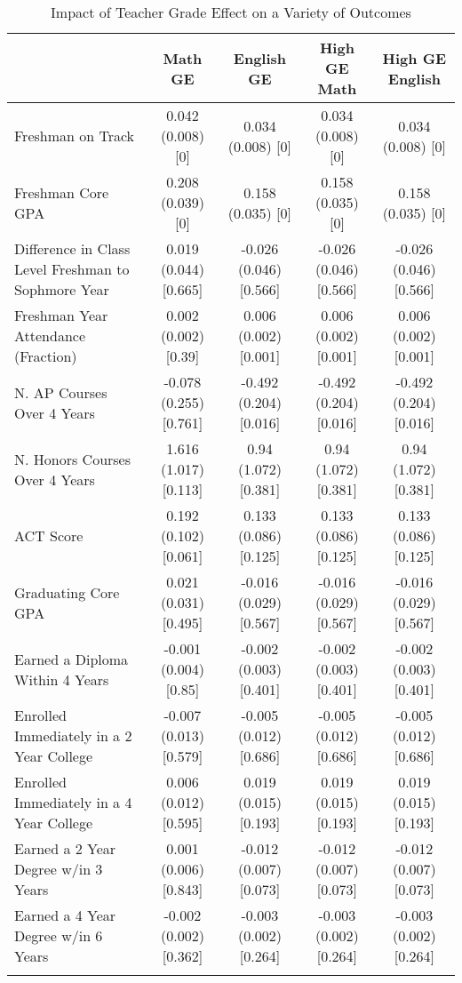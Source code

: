 \begin{table}

\caption{Impact of Teacher Grade Effect on a Variety of Outcomes\label{tbl:results}}
\centering
\begin{tabular}[t]{lcccc}
\toprule{}
  & Math GE & English GE & High GE Math & High GE English\\
\midrule{}
Freshman on Track & 0.042 (0.008) [0] & 0.034 (0.008) [0] & 0.034 (0.008) [0] & 0.034 (0.008) [0]\\
Freshman Core GPA & 0.208 (0.039) [0] & 0.158 (0.035) [0] & 0.158 (0.035) [0] & 0.158 (0.035) [0]\\
Difference in Class Level Freshman to Sophmore Year & 0.019 (0.044) [0.665] & -0.026 (0.046) [0.566] & -0.026 (0.046) [0.566] & -0.026 (0.046) [0.566]\\
Freshman Year Attendance (Fraction) & 0.002 (0.002) [0.39] & 0.006 (0.002) [0.001] & 0.006 (0.002) [0.001] & 0.006 (0.002) [0.001]\\
N. AP Courses Over 4 Years & -0.078 (0.255) [0.761] & -0.492 (0.204) [0.016] & -0.492 (0.204) [0.016] & -0.492 (0.204) [0.016]\\
\addlinespace
N. Honors Courses Over 4 Years & 1.616 (1.017) [0.113] & 0.94 (1.072) [0.381] & 0.94 (1.072) [0.381] & 0.94 (1.072) [0.381]\\
ACT Score & 0.192 (0.102) [0.061] & 0.133 (0.086) [0.125] & 0.133 (0.086) [0.125] & 0.133 (0.086) [0.125]\\
Graduating Core GPA & 0.021 (0.031) [0.495] & -0.016 (0.029) [0.567] & -0.016 (0.029) [0.567] & -0.016 (0.029) [0.567]\\
Earned a Diploma Within 4 Years & -0.001 (0.004) [0.85] & -0.002 (0.003) [0.401] & -0.002 (0.003) [0.401] & -0.002 (0.003) [0.401]\\
Enrolled Immediately in a 2 Year College & -0.007 (0.013) [0.579] & -0.005 (0.012) [0.686] & -0.005 (0.012) [0.686] & -0.005 (0.012) [0.686]\\
\addlinespace
Enrolled Immediately in a 4 Year College & 0.006 (0.012) [0.595] & 0.019 (0.015) [0.193] & 0.019 (0.015) [0.193] & 0.019 (0.015) [0.193]\\
Earned a 2 Year Degree w/in 3 Years & 0.001 (0.006) [0.843] & -0.012 (0.007) [0.073] & -0.012 (0.007) [0.073] & -0.012 (0.007) [0.073]\\
Earned a 4 Year Degree w/in 6 Years & -0.002 (0.002) [0.362] & -0.003 (0.002) [0.264] & -0.003 (0.002) [0.264] & -0.003 (0.002) [0.264]\\
\bottomrule{}
\end{tabular}
\end{table}
